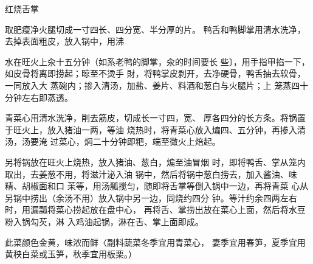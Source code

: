 \begin{recipe}{红烧舌掌}

\ingredients


\cooking

\step 取肥痩净火腿切成一寸四长、四分宽、半分厚的片。 鸭舌和鸭脚掌用清水洗净，去掉表面粗皮，放入锅中，用沸

水在旺火上汆十五分钟（如系老鸭的脚掌，汆的时间要长 些〕，用手指甲掐一下，如皮骨将离即捞起；晾至不烫手 財，将鸭掌皮剥开，去净硬骨，鸭舌抽去软骨，一同放入大 蒸碗内；掺入清汤，加盐、姜片、料酒和葱白与火腿片；上 笼蒸四十分钟左右即蒸透。

\step 青菜心用清水洗净，削去筋皮，切成长一寸四，宽、 厚各四分的长方条。将锅置于旺火上，放入猪油一两，等油 烧热时，将青菜心放入煸四、五分钟，再掺入清汤，汤要淹 过菜心，焖二十分钟即粑，端至微火上焙起。

另将锅放在旺火上烧热，放入猪油、葱白，煸至油冒烟 时，即将鸭舌、掌从笼内取出，去姜葱不用，将滋汁泌入油 锅中，然后将锅中葱白捞去，加入酱油、味精、胡椒面和口 茉等，用汤瓢搅匀，随即将舌掌等倒入锅中一边，再将青菜 心从另锅中捞出（余汤不用）放入锅中另一边，同烧约四分 钟。等汁约余四两左右时，用漏瓢将菜心捞起放在盘中心， 再将舌、掌捞出放在菜心上面，然后将水豆粉入锅勾芡，淋 入鸡油起锅，淋在舌、掌上面即成。

\notes

此菜颜色金黄，味浓而鲜〈副料蔬菜冬季宜用青菜心， 妻季宜用春笋，夏季宜用黄秧白菜或玉笋，秋季宜用板栗。）

\end{recipe}

